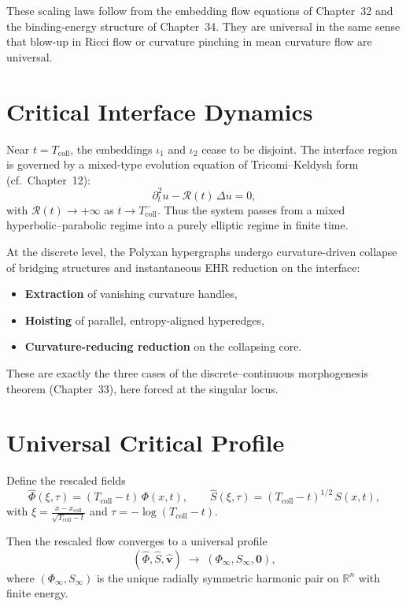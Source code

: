 These scaling laws follow from the embedding flow equations of Chapter~32 and the binding-energy structure of Chapter~34.  
They are universal in the same sense that blow-up in Ricci flow or curvature pinching in mean curvature flow are universal.

\section{Critical Interface Dynamics}

Near $t = T_{\mathrm{coll}}$, the embeddings $\iota_1$ and $\iota_2$ cease to be disjoint.  
The interface region is governed by a mixed-type evolution equation of Tricomi–Keldysh form (cf.\ Chapter~12):
\[
\partial_t^2 u - \mathcal{R}(t)\,\Delta u = 0,
\]
with $\mathcal{R}(t)\to +\infty$ as $t\to T_{\mathrm{coll}}^-$.  
Thus the system passes from a mixed hyperbolic–parabolic regime into a purely elliptic regime in finite time.

At the discrete level, the Polyxan hypergraphs undergo curvature-driven collapse of bridging structures and instantaneous EHR reduction on the interface:

\begin{itemize}
\item \textbf{Extraction} of vanishing curvature handles,
\item \textbf{Hoisting} of parallel, entropy-aligned hyperedges,
\item \textbf{Curvature-reducing reduction} on the collapsing core.
\end{itemize}

These are exactly the three cases of the discrete–continuous morphogenesis theorem (Chapter~33), here forced at the singular locus.

\section{Universal Critical Profile}

Define the rescaled fields
\[
\hat{\Phi}(\xi,\tau)
  = (T_{\mathrm{coll}} - t) \,\Phi(x,t), \qquad
\hat{S}(\xi,\tau)
  = (T_{\mathrm{coll}} - t)^{1/2}\,S(x,t),
\]
with $\xi = \frac{x - x_{\mathrm{coll}}}{\sqrt{T_{\mathrm{coll}} - t}}$ and $\tau = -\log(T_{\mathrm{coll}} - t)$.

Then the rescaled flow converges to a universal profile
\[
(\hat{\Phi}, \hat{S}, \hat{\mathbf{v}}) \;\longrightarrow\; (\Phi_\infty, S_\infty, \mathbf{0}),
\]
where $(\Phi_\infty, S_\infty)$ is the unique radially symmetric harmonic pair on $\mathbb{R}^n$ with finite energy.

